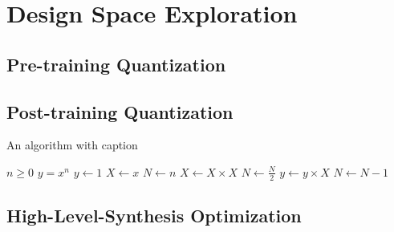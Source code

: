 \chapter{Design Space Exploration}\label{quantization}
\indo{}

\section{Pre-training Quantization}


\section{Post-training Quantization}
\begin{algorithm}
  \caption{An algorithm with caption}\label{alg:cap}
  \begin{algorithmic}
  \Require $n \geq 0$
  \Ensure $y = x^n$
  \State $y \gets 1$
  \State $X \gets x$
  \State $N \gets n$
      \State $X \gets X \times X$
      \State $N \gets \frac{N}{2}$  
      \State $y \gets y \times X$
      \State $N \gets N - 1$
  \EndIf
  \EndWhile
  \end{algorithmic}
  \end{algorithm}


\section{High-Level-Synthesis Optimization}
